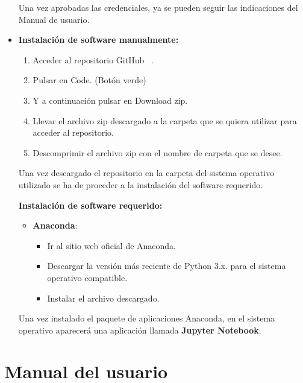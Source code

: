 \begin{itemize}
\begin{itemize}
\end{itemize}

Una vez aprobadas las credenciales, ya se pueden seguir las indicaciones del Manual de usuario.


\item
\textbf{Instalación de software manualmente:} 

\begin{enumerate}
\def\labelenumi{\arabic{enumi}.}
\tightlist
\item Acceder al repositorio GitHub ~\cite{github:proyecto}.
\item Pulsar en Code. (Botón verde)
\item Y a continuación pulsar en Download zip.


\item Llevar el archivo zip descargado a la carpeta que se quiera utilizar para acceder al repositorio.
\item Descomprimir el archivo zip con el nombre de carpeta que se desee.

\end{enumerate}

Una vez descargado el repositorio en la carpeta del sistema operativo utilizado se ha de proceder a la instalación del software requerido. 

\textbf{Instalación de software requerido:} 
  \begin{itemize}
   \tightlist
   \item
    \textbf{Anaconda}: 
    \begin{itemize}
   \tightlist
   \item
    Ir al sitio web oficial de Anaconda. ~\cite{web:Anaconda}
    
   \item
    Descargar la versión más reciente de Python 3.x. para el sistema operativo compatible.
   \item
   Instalar el archivo descargado.
   \end{itemize}
  \end{itemize}  


Una vez instalado el paquete de aplicaciones Anaconda, en el sistema operativo aparecerá una aplicación llamada \textbf{Jupyter Notebook}.


\end{itemize}


\section{Manual del usuario}


